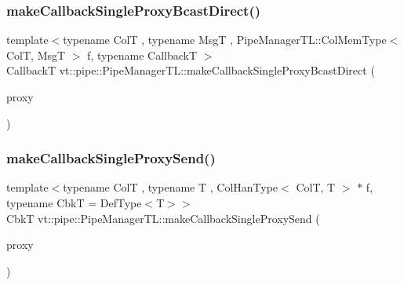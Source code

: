 \subsubsection{\texorpdfstring{make\+Callback\+Single\+Proxy\+Bcast\+Direct()}{makeCallbackSingleProxyBcastDirect()}\hspace{0.1cm}{\footnotesize\ttfamily [3/3]}}
{\footnotesize\ttfamily template$<$typename ColT , typename MsgT , Pipe\+Manager\+T\+L\+::\+Col\+Mem\+Type$<$ Col\+T, Msg\+T $>$ f, typename CallbackT $>$ \\
CallbackT vt\+::pipe\+::\+Pipe\+Manager\+T\+L\+::make\+Callback\+Single\+Proxy\+Bcast\+Direct (\begin{DoxyParamCaption}\item[{\hyperlink{structvt_1_1pipe_1_1_pipe_manager_t_l_af56c58cad882496e35f01227d4da3898}{Col\+Proxy\+Type}$<$ ColT $>$}]{proxy }\end{DoxyParamCaption})}

\mbox{\label{structvt_1_1pipe_1_1_pipe_manager_t_l_a2c8c3a5aca22b2526fe68dd543a8a888}} 
\subsubsection{\texorpdfstring{make\+Callback\+Single\+Proxy\+Send()}{makeCallbackSingleProxySend()}\hspace{0.1cm}{\footnotesize\ttfamily [1/3]}}
{\footnotesize\ttfamily template$<$typename ColT , typename T , Col\+Han\+Type$<$ Col\+T, T $>$ $\ast$ f, typename CbkT  = Def\+Type$<$\+T$>$$>$ \\
CbkT vt\+::pipe\+::\+Pipe\+Manager\+T\+L\+::make\+Callback\+Single\+Proxy\+Send (\begin{DoxyParamCaption}\item[{typename Col\+T\+::\+Proxy\+Type}]{proxy }\end{DoxyParamCaption})}

\mbox{\label{structvt_1_1pipe_1_1_pipe_manager_t_l_a0da1b385495f0a625754f17db45a4066}} 

